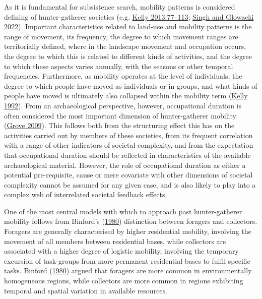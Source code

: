 \documentclass[
  12pt,
  a4paper,
  oneside]{book}
\begin{document}
As it is fundamental for subsistence search, mobility patterns is considered defining of hunter-gatherer societies (e.g. \protect\hyperlink{ref-kelly2013}{Kelly 2013:77--113}; \protect\hyperlink{ref-singh2022}{Singh and Glowacki 2022}). Important characteristics related to land-use and mobility patterns is the range of movement, its frequency, the degree to which movement ranges are territorially defined, where in the landscape movement and occupation occurs, the degree to which this is related to different kinds of activities, and the degree to which these aspects varies annually, with the seasons or other temporal frequencies. Furthermore, as mobility operates at the level of individuals, the degree to which people have moved as individuals or in groups, and what kinds of people have moved is ultimately also collapsed within the mobility term (\protect\hyperlink{ref-kelly1992}{Kelly 1992}). From an archaeological perspective, however, occupational duration is often considered the most important dimension of hunter-gatherer mobility (\protect\hyperlink{ref-grove2009}{Grove 2009}). This follows both from the structuring effect this has on the activities carried out by members of these societies, from its frequent correlation with a range of other indicators of societal complexity, and from the expectation that occupational duration should be reflected in characteristics of the available archaeological material. However, the role of occupational duration as either a potential pre-requisite, cause or mere covariate with other dimensions of societal complexity cannot be assumed for any given case, and is also likely to play into a complex web of interrelated societal feedback effects.

One of the most central models with which to approach past hunter-gatherer mobility follows from Binford's (\protect\hyperlink{ref-binford1980}{1980}) distinction between foragers and collectors. Foragers are generally characterised by higher residential mobility, involving the movement of all members between residential bases, while collectors are associated with a higher degree of logistic mobility, involving the temporary excursion of task-groups from more permanent residential bases to fulfil specific tasks. Binford (\protect\hyperlink{ref-binford1980}{1980}) argued that foragers are more common in environmentally homogeneous regions, while collectors are more common in regions exhibiting temporal and spatial variation in available resources.
\end{document}

